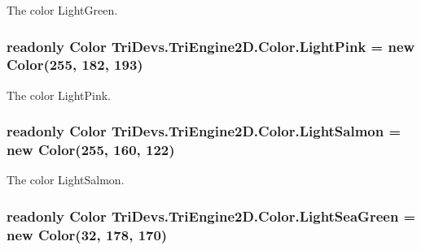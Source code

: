 The color Light\-Green. 

\hypertarget{struct_tri_devs_1_1_tri_engine2_d_1_1_color_af9d2d370d6e45c11982ca540ed6a65bd}{
\subsubsection[{Light\-Pink}]{\setlength{\rightskip}{0pt plus 5cm}readonly {\bf Color} Tri\-Devs.\-Tri\-Engine2\-D.\-Color.\-Light\-Pink = new {\bf Color}(255, 182, 193)\hspace{0.3cm}{\ttfamily [static]}}}\label{struct_tri_devs_1_1_tri_engine2_d_1_1_color_af9d2d370d6e45c11982ca540ed6a65bd}


The color Light\-Pink. 

\hypertarget{struct_tri_devs_1_1_tri_engine2_d_1_1_color_ad0ae2ed966eca1692513bfaa652f1ab3}{
\subsubsection[{Light\-Salmon}]{\setlength{\rightskip}{0pt plus 5cm}readonly {\bf Color} Tri\-Devs.\-Tri\-Engine2\-D.\-Color.\-Light\-Salmon = new {\bf Color}(255, 160, 122)\hspace{0.3cm}{\ttfamily [static]}}}\label{struct_tri_devs_1_1_tri_engine2_d_1_1_color_ad0ae2ed966eca1692513bfaa652f1ab3}


The color Light\-Salmon. 

\hypertarget{struct_tri_devs_1_1_tri_engine2_d_1_1_color_a12637153d2dbb90d48b7311dfcd390db}{
\subsubsection[{Light\-Sea\-Green}]{\setlength{\rightskip}{0pt plus 5cm}readonly {\bf Color} Tri\-Devs.\-Tri\-Engine2\-D.\-Color.\-Light\-Sea\-Green = new {\bf Color}(32, 178, 170)\hspace{0.3cm}{\ttfamily [static]}}}\label{struct_tri_devs_1_1_tri_engine2_d_1_1_color_a12637153d2dbb90d48b7311dfcd390db}


